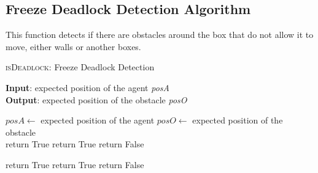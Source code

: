 \documentclass{article}
\begin{document}
\subsection{Freeze Deadlock Detection Algorithm}

This function detects if there are obstacles around the box that do not allow it to move, either walls or another boxes.

\begin{algorithm}
    \caption{\textsc{isDeadlock}: Freeze Deadlock Detection}\label{euclid}
    \hspace*{\algorithmicindent} \textbf{Input}: expected position of the agent \emph{posA} \\
    \hspace*{\algorithmicindent} \textbf{Output}: expected position of the obstacle \emph{posO} \\
    \begin{algorithmic}
    \State $posA \gets$ expected position of the agent
    \State $posO \gets$ expected position of the obstacle \\
            \State return True
            \State return True
        \Else
            \State return False
        \EndIf

            \State return True
            \State return True
        \Else
            \State return False
        \EndIf
    \EndIf 
    \end{algorithmic}
\end{algorithm}


\end{document}
